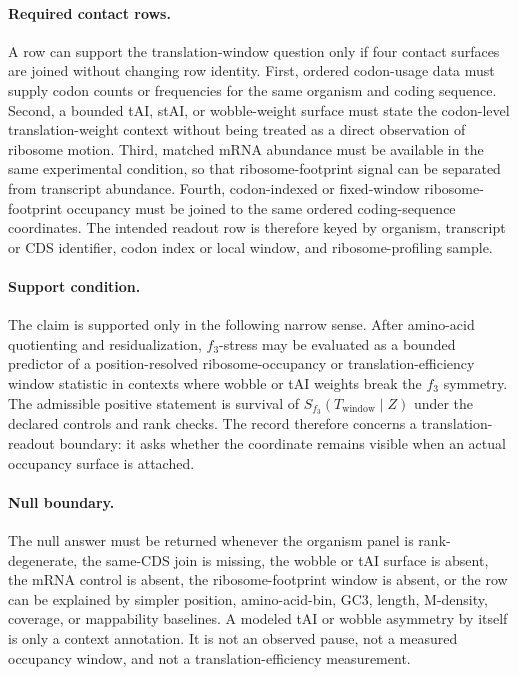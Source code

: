 \paragraph{Required contact rows.}
A row can support the translation-window question only if four contact surfaces are joined without changing row identity.  First, ordered codon-usage data must supply codon counts or frequencies for the same organism and coding sequence.  Second, a bounded tAI, stAI, or wobble-weight surface must state the codon-level translation-weight context without being treated as a direct observation of ribosome motion.  Third, matched mRNA abundance must be available in the same experimental condition, so that ribosome-footprint signal can be separated from transcript abundance.  Fourth, codon-indexed or fixed-window ribosome-footprint occupancy must be joined to the same ordered coding-sequence coordinates.  The intended readout row is therefore keyed by organism, transcript or CDS identifier, codon index or local window, and ribosome-profiling sample.

\paragraph{Support condition.}
The claim is supported only in the following narrow sense.  After amino-acid quotienting and residualization, $f_3$-stress may be evaluated as a bounded predictor of a position-resolved ribosome-occupancy or translation-efficiency window statistic in contexts where wobble or tAI weights break the $f_3$ symmetry.  The admissible positive statement is survival of $S_{f_3}(T_{\mathrm{window}}\mid Z)$ under the declared controls and rank checks.  The record therefore concerns a translation-readout boundary: it asks whether the coordinate remains visible when an actual occupancy surface is attached.

\paragraph{Null boundary.}
The null answer must be returned whenever the organism panel is rank-degenerate, the same-CDS join is missing, the wobble or tAI surface is absent, the mRNA control is absent, the ribosome-footprint window is absent, or the row can be explained by simpler position, amino-acid-bin, GC3, length, M-density, coverage, or mappability baselines.  A modeled tAI or wobble asymmetry by itself is only a context annotation.  It is not an observed pause, not a measured occupancy window, and not a translation-efficiency measurement.

